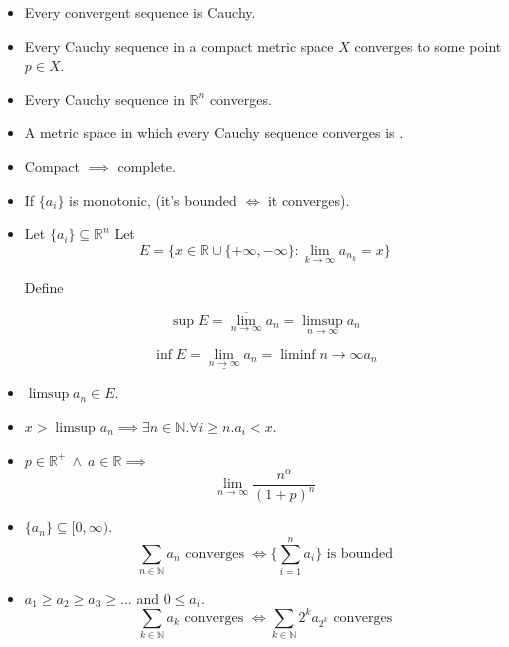 \documentclass[11pt]{article}
\newcommand{\nat}{\mathbb{N}}
\newcommand{\reals}{\mathbb{R}}
\newcommand{\boxinate}[1]{\framebox[1.1\width]{#1}}
\newcommand{\tand}{~\land~}
\begin{document}
\begin{itemize}
\item Every convergent sequence is Cauchy.

\item Every Cauchy sequence in a compact metric space $X$ converges to some
  point $p \in X$.

\item Every Cauchy sequence in $\reals^n$ converges.

\item A metric space in which every Cauchy sequence converges is
  \boxinate{complete}.

\item Compact $\implies$ complete.

\item If $\{a_i\}$ is monotonic, (it's bounded $\iff$ it converges).

\item Let $\{a_i\} \subseteq \reals^n$ Let
  $$E = \{x \in \reals \cup \{+\infty, -\infty\} : \lim_{k\rightarrow \infty}
  a_{n_k} = x\}$$

  Define

  $$\sup E = \overline{\lim_{n\rightarrow\infty}} a_n = \limsup_{n\rightarrow
    \infty} a_n$$

  $$\inf E = \underline{\lim_{n\rightarrow\infty}} a_n = \liminf{n\rightarrow
    \infty} a_n$$

\item $\limsup a_n \in E$.

\item $x > \limsup a_n \implies \exists n \in \nat . \forall i \geq n . a_i <
  x$.

\item $p \in \reals^+ \tand a \in \reals \implies$
  $$\lim_{n \rightarrow \infty} \frac{n^\alpha}{(1+p)^n}$$

\item $\{a_n\} \subseteq [0, \infty)$.
  $$\sum_{n \in \nat} a_n\text{ converges }\iff \{\sum_{i=1}^n a_i\} \text{ is
    bounded}$$

\item $a_1 \geq a_2 \geq a_3 \geq \ldots$ and $0 \leq a_i$.
  $$\sum_{k \in \nat} a_k \text{ converges } \iff \sum_{k \in \nat} 2^k a_{2^k}
  \text{ converges}$$

\end{itemize}

\end{document}
